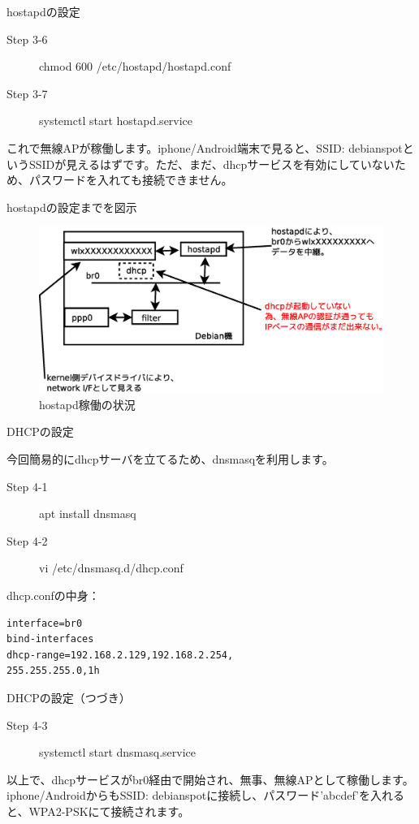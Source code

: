 \begin{frame}{hostapdの設定}

  \begin{description}
  \item [Step 3-6] chmod 600 /etc/hostapd/hostapd.conf
  \item [Step 3-7] systemctl start hostapd.service
  \end{description}      

  これで無線APが稼働します。iphone/Android端末で見ると、SSID: debianspotというSSIDが見えるはずです。ただ、まだ、dhcpサービスを有効にしていないため、パスワードを入れても接続できません。
\end{frame}


\begin{frame}{hostapdの設定までを図示}

\begin{figure}[htbp]
\includegraphics[width=0.8\hsize]{image201512/hostapd.eps}
\caption{hostapd稼働の状況}
\end{figure}

\end{frame}

\begin{frame}[containsverbatim]{DHCPの設定}

  今回簡易的にdhcpサーバを立てるため、dnsmasqを利用します。
  \begin{description}
  \item [Step 4-1] apt install dnsmasq
  \item [Step 4-2] vi /etc/dnsmasq.d/dhcp.conf
  \end{description}      

dhcp.confの中身：
\begin{verbatim}
interface=br0
bind-interfaces
dhcp-range=192.168.2.129,192.168.2.254,
255.255.255.0,1h
\end{verbatim}
  
\end{frame}

\begin{frame}[containsverbatim]{DHCPの設定（つづき）}

  \begin{description}
  \item [Step 4-3] systemctl start dnsmasq.service
  \end{description}      

  以上で、dhcpサービスがbr0経由で開始され、無事、無線APとして稼働します。iphone/AndroidからもSSID: debianspotに接続し、パスワード'abcdef'を入れると、WPA2-PSKにて接続されます。
  
\end{frame}

